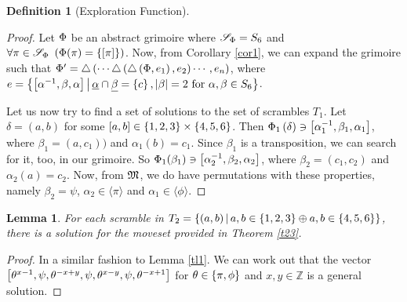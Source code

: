 \documentclass[a4paper,twoside,12pt,openany]{report}
\theoremstyle{plain}
\newtheorem{lemma}{Lemma}
\theoremstyle{definition}
\newtheorem{definition}{Definition}
\theoremstyle{remark}
\begin{document}
\begin{definition}[Exploration Function]
\begin{proof}
	Let \(\Phi\) be an abstract grimoire where \(\mathscr{S}_{\Phi}=S_6\) and \(\forall \pi\in\mathscr{S}_{\Phi}\ \left(\Phi(\pi)=\left\{ \left[ \pi \right]  \right\}\right)\). Now, from Corollary \ref{cor1}, we can expand the grimoire such that \(\Phi'=\triangle\left(\cdots\triangle\left(\triangle\left(\Phi, e_1\right), e_2\right)\cdots, e_n\right)\), where \(e=\left\{ \left[ \alpha^{-1},\beta,\alpha \right] \,\middle|\, \underline{\alpha}\cap\underline{\beta}=\left\{ c \right\}, \left|\beta\right|=2\ \text{for}\ \alpha,\beta\in S_6 \right\}\).

	Let us now try to find a set of solutions to the set of scrambles \(T_1\). Let \(\delta=(a,b)\) for some \(\left[ a,b \right]\in\left\{ 1,2,3 \right\}\times\left\{ 4,5,6 \right\}\). Then \(\Phi_1\left(\delta\right) \ni \left[ \alpha_1^{-1}, \beta_1,\alpha_1 \right]\), where \(\beta_1=(a,c_1))\) and \(\alpha_1(b)=c_1\). Since \(\beta_1\) is a transposition, we can search for it, too, in our grimoire. So \(\Phi_1(\beta_1)\ni\left[ \alpha_2^{-1}, \beta_2,\alpha_2 \right]\), where \(\beta_2=(c_1,c_2)\) and \(\alpha_2(a)=c_2\). Now, from \(\mathfrak{M}\), we do have permutations with these properties, namely \(\beta_2=\psi\), \(\alpha_2\in\langle\pi\rangle\) and \(\alpha_1\in\langle\phi\rangle\).
\end{proof}

\begin{lemma}\label{tl2}
	For each scramble in \(T_2=\left\{ (a,b) \,\middle|\, a,b\in\left\{ 1,2,3 \right\} \oplus a,b\in\left\{ 4,5,6 \right\} \right\}\), there is a solution for the moveset provided in Theorem \ref{t23}.
\end{lemma}

\begin{proof}
	In a similar fashion to Lemma \ref{tl1}. We can work out that the vector \(\left[ \theta^{x-1},\psi,\theta^{-x +y},\psi,\theta^{x-y},\psi,\theta^{-x + 1} \right]\) for \(\theta\in\left\{ \pi,\phi \right\}\) and \(x,y\in\mathbb{Z}\) is a general solution.
\end{proof}


\end{definition}
\end{document}
